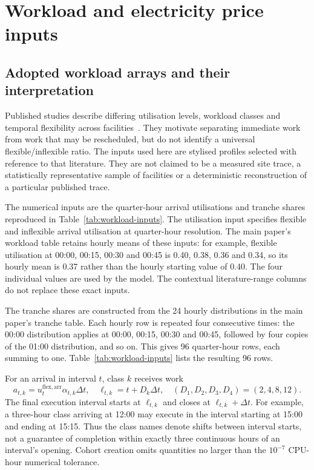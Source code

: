 \section{Workload and \textcolor{LatestGreen}{electricity price} inputs}
\subsection{Adopted workload arrays and their interpretation}
Published studies describe differing utilisation levels, workload classes and temporal flexibility across facilities~\cite{Cao2022ApEn,6779441,Misaghian2023TIA,Liu2012PER}. They motivate separating immediate work from work that may be rescheduled, but do not identify a universal flexible/inflexible ratio. The inputs used here are stylised profiles selected with reference to that literature. They are not claimed to be a measured site trace, a statistically representative sample of facilities or a deterministic reconstruction of a particular published trace.

The numerical inputs are the quarter-hour arrival utilisations and tranche shares reproduced in Table~\ref{tab:workload-inputs}. The utilisation input specifies flexible and inflexible arrival utilisation at quarter-hour resolution. The main paper's workload table retains hourly means of these inputs: for example, flexible utilisation at 00:00, 00:15, 00:30 and 00:45 is 0.40, 0.38, 0.36 and 0.34, so its hourly mean is 0.37 rather than the hourly starting value of 0.40. The four individual values are used by the model. The contextual literature-range columns do not replace these exact inputs.

The \textcolor{LatestGreen}{tranche shares} are constructed from the 24 hourly distributions in the main paper's tranche table. Each hourly row is repeated four consecutive times: the 00:00 distribution applies at 00:00, 00:15, 00:30 and 00:45, followed by four copies of the 01:00 distribution, and so on. This gives 96 quarter-hour rows, each summing to one. Table~\ref{tab:workload-inputs} lists the resulting 96 rows.

For an arrival in interval $t$, class $k$ receives work
\begin{equation}
a_{t,k}=u_t^{\mathrm{flex,arr}}\alpha_{t,k}\Delta t,
\quad \ell_{t,k}=t+D_k\Delta t,
\quad (D_1,D_2,D_3,D_4)=(2,4,8,12).
\end{equation}
The final execution interval starts at $\ell_{t,k}$ and closes at $\ell_{t,k}+\Delta t$. For example, a three-hour class arriving at 12:00 may execute in the interval starting at 15:00 and ending at 15:15. Thus the class names denote shifts between interval starts, not a guarantee of completion within exactly three continuous hours of an interval's opening. Cohort creation omits quantities no larger than the $10^{-7}$ CPU-hour numerical tolerance.

